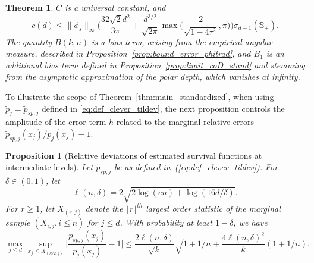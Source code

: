\documentclass{article}
\numberwithin{equation}{section}
\newtheorem{theorem}{Theorem}[section]
\newtheorem{proposition}{Proposition}[section]
\newcommand{\sphere}{\mathbb{S}}
\begin{document}
\begin{theorem}
$C$  is a  universal constant, and %
$$
c(d) \le \|\phi_s\|_\infty\bigg(
 \frac{32\sqrt{2} d^{2}}{3\pi} + 
 \frac{d^{3/2}}{\sqrt{2\pi}}
      \max\Big(\frac{2 }{\sqrt{1 - 4\tau^2}}, 
       \pi %
       \Big)
\bigg)\sigma_{d-1}(\sphere_+).
$$
The quantity $B(k,n)$ is a   bias term, %
arising from the empirical angular measure, described in Proposition~\ref{prop:bound_error_phitrad}, and 
$B_1$ is an additional bias term defined in Proposition~\ref{prop:limit_coD_stand} and stemming from the asymptotic approximation of the polar depth, which vanishes at infinity.
\end{theorem}


To illustrate the scope of Theorem~\ref{thm:main_standardized}, when using $\tilde p_j = \tilde p_{sp,j}$ defined in \eqref{eq:def_clever_tildev}, the next proposition controls the amplitude of the error term $h$ related to the marginal relative errors $\tilde p_{sp,j}(x_j)/p_{j}(x_j) - 1$. 

\begin{proposition}[Relative deviations of estimated survival functions at intermediate levels]\label{prop:control_relative_marginal_dev_x_small}
  Let $\tilde p_{sp,j}$ be as defined in~(\ref{eq:def_clever_tildev}). For $\delta\in(0,1)$, let $$\ell(n,\delta) = 2 \sqrt{ 2 \log(en) + \log(16d/\delta)  }.$$  
For $r\ge 1$,  let $X_{(r,j)}$ denote the $\lfloor r \rfloor^{th}$ largest order statistic of the marginal sample $(X_{i,j}, i\le n)$ for $j\le d$. 
 With probability at least $1-\delta$, we have 
 $$
 \max_{j\le d} \sup_{ x_j  \le X_{(k/2,j)} } \Big|
 \frac{\tilde p_{sp,j}(x_j)}{p_j(x_j)} - 1\Big|
\le \frac{2 \ell(n,\delta)}{\sqrt{k}} \sqrt{1 +1/n} + \frac{4 \ell(n,\delta)^2}{k} (1 +1/n) . 
$$
\end{proposition}

 
\end{document}
